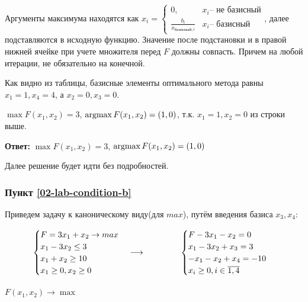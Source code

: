 Аргументы максимума находятся как $x_i = \begin{cases}
    0, &x_i \text{-- не базисный}\\
    \frac{b_i}{x_{\text{базисный}, i}} &x_i \text{-- базисный}
\end{cases}$, далее подставляются в исходную функцию. Значение после подстановки 
и в правой нижней ячейке при учете множителя перед $F$ должны совпасть. Причем на любой итерации, не обязательно на конечной.


Как видно из таблицы, базисные элементы оптимального метода равны $x_1 = 1, x_4 = 4$, а $x_2 = 0, x_3 = 0$.

$\max F(x_1, x_2) = 3$, $\operatorname*{argmax} F(x_1, x_2) = (1, 0)$, т.к. $x_1 = 1, x_2 = 0$ из строки выше.

\textbf{Ответ:} $\max F(x_1, x_2) = 3$, $\operatorname*{argmax} F(x_1, x_2) = (1, 0)$ \label{02-lab-a-answer}

Далее решение будет идти без подробностей.

\subsubsection{Пункт \ref{02-lab-condition-b}} \label{02-lab-b}

Приведем задачу к каноническому виду(для $max$), путём введения базиса $x_3, x_4$:

\begin{align*}
    \begin{cases}
        F = 3x_1 + x_2\to max\\
        x_1 - 3x_2 \leq 3\\
        x_1 + x_2 \geq 10\\
        x_1 \geq 0, x_2 \geq 0
    \end{cases} \longrightarrow
    \hspace{1.5cm}
    \begin{cases}
        F - 3x_1 - x_2 = 0\\
        x_1 - 3x_2 + x_3 = 3\\
        -x_1 - x_2 + x_4 = -10\\
        x_{i} \geq 0, i\in\overline{1,4}
    \end{cases}
\end{align*}

\paragraph{$F(x_1, x_2) \to \max$}

